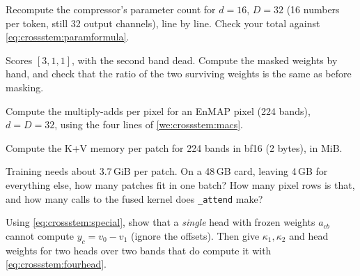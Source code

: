 \begin{checkyourself}
\item\label{ex:crossstem:1} Recompute the compressor's parameter count for $d = 16$, $D = 32$ (16 numbers per token, still 32 output channels), line by line. Check your total against \cref{eq:crossstem:paramformula}.
\item\label{ex:crossstem:2} Scores $[3, 1, 1]$, with the second band dead. Compute the masked weights by hand, and check that the ratio of the two surviving weights is the same as before masking.
\item\label{ex:crossstem:3} Compute the multiply-adds per pixel for an EnMAP pixel (224 bands), $d = D = 32$, using the four lines of \cref{we:crossstem:macs}.
\item\label{ex:crossstem:4} Compute the K+V memory per patch for 224 bands in bf16 (2 bytes), in MiB.
\item\label{ex:crossstem:5} Training needs about 3.7\,GiB per patch. On a 48\,GB card, leaving 4\,GB for everything else, how many patches fit in one batch? How many pixel rows is that, and how many calls to the fused kernel does \texttt{\_attend} make?
\item\label{ex:crossstem:6} Using \cref{eq:crossstem:special}, show that a \emph{single} head with frozen weights $a_{cb}$ cannot compute $y_c = v_0 - v_1$ (ignore the offsets). Then give $\kappa_1, \kappa_2$ and head weights for two heads over two bands that do compute it with \cref{eq:crossstem:fourhead}.
\end{checkyourself}

